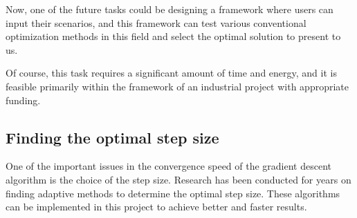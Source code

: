 \documentclass{article}
\begin{document}
Now, one of the future tasks could be designing a framework where users can input their scenarios, and this framework can test various conventional optimization methods in this field and select the optimal solution to present to us.

Of course, this task requires a significant amount of time and energy, and it is feasible primarily within the framework of an industrial project with appropriate funding.

\subsection{Finding the optimal step size}
One of the important issues in the convergence speed of the gradient descent algorithm is the choice of the step size. Research has been conducted for years on finding adaptive methods to determine the optimal step size. These algorithms can be implemented in this project to achieve better and faster results.








\end{document}
